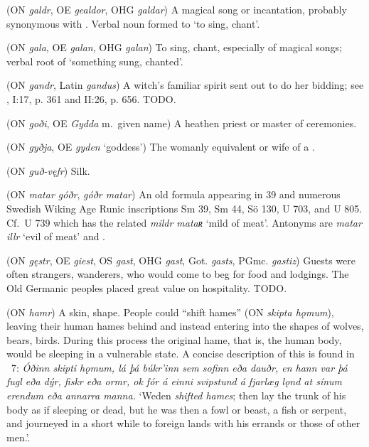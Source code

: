 \begin{itemize}
 (ON \emph{galdr}, OE \emph{gealdor}, OHG \emph{galdar})
  A magical song or incantation, probably synonymous with .  Verbal noun formed to  ‘to sing, chant’.

 (ON \emph{gala}, OE \emph{galan}, OHG \emph{galan})
  To sing, chant, especially of magical songs; verbal root of  ‘something sung, chanted’.

 (ON \emph{gandr}, Latin \emph{gandus})
  A witch’s familiar spirit sent out to do her bidding; see \textcite[62--73]{Tolley1995},  I:17, p. 361 and II:26, p. 656.  TODO.

 (ON \emph{goði}, OE \emph{Gydda} m.~given name)
  A heathen priest or master of ceremonies.

 (ON \emph{gyðja}, OE \emph{gyden} ‘goddess’)
  The womanly equivalent or wife of a .

 (ON \emph{guð-vęfr})
  Silk.

 (ON \emph{matar góðr}, \emph{góðr matar})
   An old formula appearing in  39 and numerous Swedish Wiking Age Runic inscriptions Sm 39, Sm 44, Sö 130, U 703, and U 805.  Cf.~U 739 which has the related \emph{mildr mataʀ} ‘mild of meat’.  Antonyms are \emph{matar illr} ‘evil of meat’ and .

 (ON \emph{gęstr}, OE \emph{giest}, OS \emph{gast}, OHG \emph{gast}, Got. \emph{gasts}, PGmc. \emph{gastiz})
  Guests were often strangers, wanderers, who would come to beg for food and lodgings.  The Old Germanic peoples placed great value on hospitality. TODO.

 (ON \emph{hamr})
  A skin, shape. People could “shift hames” (ON \emph{skipta hǫmum}), leaving their human hames behind and instead entering into the shapes of wolves, bears, birds.  During this process the original hame, that is, the human body, would be sleeping in a vulnerable state. A concise description of this is found in \YnglingaSaga\ 7: \emph{Óðinn \emph{skipti hǫmum}, lá þá búkr’inn sem sofinn eða dauðr, en hann var þá fugl eða dýr, fiskr eða ormr, ok fór á einni svipstund á fjarlæg lǫnd at sínum erendum eða annarra manna.} ‘Weden \emph{shifted hames}; then lay the trunk of his body as if sleeping or dead, but he was then a fowl or beast, a fish or serpent, and journeyed in a short while to foreign lands with his errands or those of other men.’.


\end{itemize}
